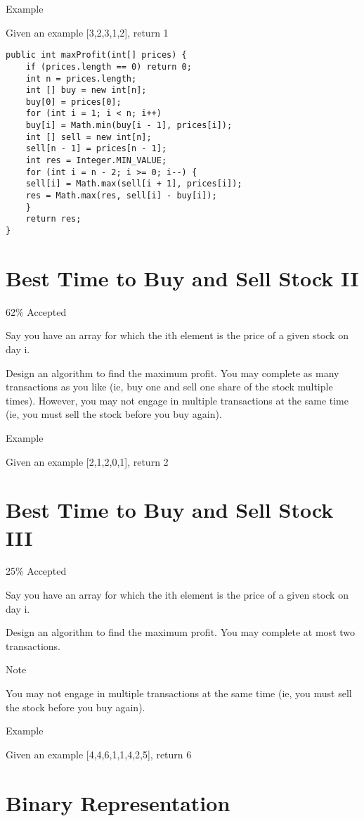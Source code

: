 \documentclass[12pt]{book}
\begin{document}
Example

Given an example [3,2,3,1,2], return 1
\lstset{language=java,label= ,caption= ,numbers=none}
\begin{lstlisting}
public int maxProfit(int[] prices) {
    if (prices.length == 0) return 0;
    int n = prices.length;
    int [] buy = new int[n];
    buy[0] = prices[0];
    for (int i = 1; i < n; i++)
	buy[i] = Math.min(buy[i - 1], prices[i]);
    int [] sell = new int[n];
    sell[n - 1] = prices[n - 1];
    int res = Integer.MIN_VALUE;
    for (int i = n - 2; i >= 0; i--) {
	sell[i] = Math.max(sell[i + 1], prices[i]);
	res = Math.max(res, sell[i] - buy[i]);
    }
    return res;
}
\end{lstlisting}
\chapter{Best Time to Buy and Sell Stock II}
\label{sec-10}

62\% Accepted

Say you have an array for which the ith element is the price of a given stock on day i.

Design an algorithm to find the maximum profit. You may complete as many transactions as you like (ie, buy one and sell one share of the stock multiple times). However, you may not engage in multiple transactions at the same time (ie, you must sell the stock before you buy again).

Example

Given an example [2,1,2,0,1], return 2
\chapter{Best Time to Buy and Sell Stock III}
\label{sec-11}

25\% Accepted

Say you have an array for which the ith element is the price of a given stock on day i.

Design an algorithm to find the maximum profit. You may complete at most two transactions.

Note

You may not engage in multiple transactions at the same time (ie, you must sell the stock before you buy again).

Example

Given an example [4,4,6,1,1,4,2,5], return 6
\chapter{Binary Representation}
\label{sec-12}
\end{document}
